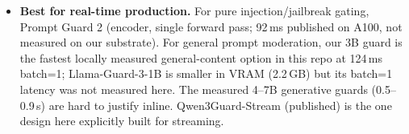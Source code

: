 \begin{itemize}
  \item \textbf{Best for real-time production.} For pure injection/jailbreak gating, Prompt Guard 2 (encoder, single forward pass; 92\,ms published on A100, not measured on our substrate). For general prompt moderation, our 3B guard is the fastest locally measured general-content option in this repo at 124\,ms batch=1; Llama-Guard-3-1B is smaller in VRAM (2.2\,GB) but its batch=1 latency was not measured here. The measured 4--7B generative guards (0.5--0.9\,s) are hard to justify inline. Qwen3Guard-Stream (published) is the one design here explicitly built for streaming.
\end{itemize}
